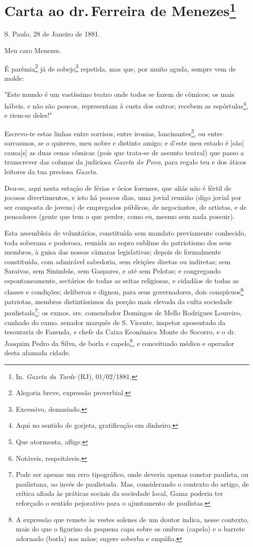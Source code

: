 \chapter{Carta ao dr.\,Ferreira de Menezes\footnote[*]{In.
  \emph{Gazeta da Tarde} (RJ), 01/02/1881.}}

S. Paulo, 28 de Janeiro de 1881.

Meu caro Menezes.

É parêmia\footnote{Alegoria breve, expressão proverbial.} já de
sobejo\footnote{Excessivo, demasiado.} repetida, mas que, por muito
aguda, sempre vem de molde:

"Este mundo é um vastíssimo teatro onde todos se fazem de cômicos; os
mais hábeis, e não são poucos, representam à custa dos outros; recebem
as espórtulas\footnote{Aqui no sentido de gorjeta, gratificação em
  dinheiro.}, e riem-se deles!"

Escrevo-te estas linhas entre sorrisos, entre ironias,
lancinantes\footnote{Que atormenta, aflige.}, ou entre sarcasmos, se o
quiseres, meu nobre e distinto amigo; e d'este meu estado é {[}são{]}
causa{[}s{]} as duas cenas cômicas (pois que trata-se de assunto
teatral) que passo a transcrever das colunas da judiciosa \emph{Gazeta
do Povo}, para regalo teu e dos áticos leitores da tua preciosa
\emph{Gazeta}.

Deu-se, aqui nesta estação de férias e ócios forenses, que aliás não é
fértil de jocosos divertimentos, e isto há poucos dias, uma jovial
reunião (digo jovial por ser composta de jovens) de empregados públicos,
de negociantes, de artistas, e de pensadores (gente que tem o que
perder, como eu, mesmo sem nada possuir).

Esta assembleia de voluntários, constituída sem mandato previamente
conhecido, toda soberana e poderosa, reunida ao sopro sublime do
patriotismo dos seus membros, à guisa das nossas câmaras legislativas;
depois de formalmente constituída, com admirável sabedoria, sem eleições
diretas ou indiretas; sem Saraivas, sem Sinimbús, sem Gaspares, e até
sem Pelotas; e congregando espontaneamente, sectários de todas as seitas
religiosas, e cidadãos de todas as classes e condições; deliberou e
dignou, para seus governadores, dois conspícuos\footnote{Notáveis,
  respeitáveis.} patriotas, membros distintíssimos da porção mais
elevada da culta sociedade paulistada\footnote{Pode ser apenas um erro
  tipográfico, onde deveria apenas constar paulista, ou paulistana, ao
  invés de paulistada. Mas, considerando o contexto do artigo, de
  crítica afiada às práticas sociais da sociedade local, Gama poderia
  ter reforçado o sentido pejorativo para o ajuntamento de paulistas.}:
os exmos. srs. comendador Domingos de Mello Rodrigues Loureiro, cunhado
do exmo. senador marquês de S. Vicente, inspetor aposentado da
tesouraria de Fazenda, e chefe da Caixa Econômica Monte do Socorro, e o
dr. Joaquim Pedro da Silva, de borla e capelo\footnote{A expressão que
  remete às vestes solenes de um doutor indica, nesse contexto, mais do
  que o figurino da pequena capa sobre os ombros (capelo) e o barrete
  adornado (borla) nas mãos; sugere soberba e empáfia.}, e conceituado
médico e operador desta afamada cidade.

